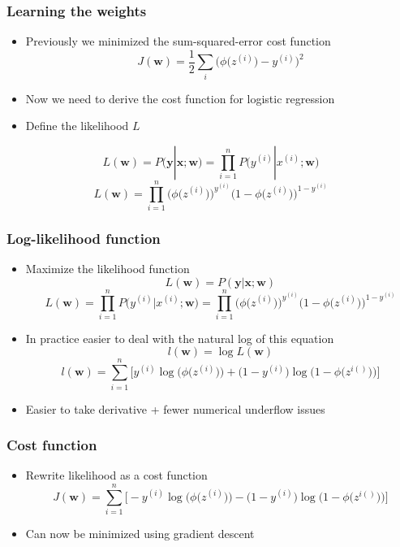 \documentclass{beamer}
\begin{document}
\begin{frame}
  \frametitle{Learning the weights}
  \begin{itemize}
  \item Previously we minimized the sum-squared-error cost function
    \[
    J(\mathbf{w}) = \frac{1}{2} \sum_i \bigg( \phi \big( z^{(i)} \big) - y^{(i)}  \bigg)^2
    \]
  \item Now we need to derive the cost function for logistic regression
  \item Define the likelihood $L$
  \end{itemize}
  \[
  L(\mathbf{w}) = P(\mathbf{y} | \mathbf{x}; \mathbf{w}) = \prod_{i=1}^{n} P \big( y^{(i)} | x^{(i)}; \mathbf{w} \big)
  \]
  \[
  L(\mathbf{w}) = \prod_{i=1}^{n} \bigg( \phi \big(z^{(i)} \big) \bigg) ^ {y^{(i)}} \bigg( 1 - \phi \big( z^{(i)} \big) \bigg)^{1-y^{(i)}}
  \]
\end{frame}

\begin{frame}
  \frametitle{Log-likelihood function}
  \begin{itemize}
  \item Maximize the likelihood function
    \[
    L(\mathbf{w}) = P(\mathbf{y} | \mathbf{x}; \mathbf{w})
    \]
    \[
    L(\mathbf{w}) = \prod_{i=1}^{n} P \big( y^{(i)} | x^{(i)}; \mathbf{w} \big) =  \prod_{i=1}^{n} \bigg( \phi \big(z^{(i)} \big) \bigg) ^ {y^{(i)}} \bigg( 1 - \phi \big( z^{(i)} \big) \bigg)^{1-y^{(i)}}
    \]
  \item In practice easier to deal with the natural log of this equation
    \[
    l(\mathbf{w}) = \log L(\mathbf{w})
    \]
    \[
    l(\mathbf{w}) = \sum_{i=1}^{n} \Bigg[ y^{(i)} \log \bigg(\phi \big( z^{(i)} \big) \bigg) + \bigg(1 - y^{(i)} \bigg) \log \bigg( 1 - \phi \big( z^{i()} \big) \bigg)  \Bigg]
    \]
    \item Easier to take derivative + fewer numerical underflow issues
  \end{itemize}
\end{frame}

\begin{frame}
  \frametitle{Cost function}
  \begin{itemize}
  \item Rewrite likelihood as a cost function
    \[
    J(\mathbf{w}) = \sum_{i=1}^{n} \Bigg[- y^{(i)} \log \bigg(\phi \big( z^{(i)} \big) \bigg) - \bigg(1 - y^{(i)} \bigg) \log \bigg( 1 - \phi \big( z^{i()} \big) \bigg)  \Bigg]
    \]
  \item Can now be minimized using gradient descent
  \end{itemize} \href{https://github.com/rasbt/python-machine-learning-book/blob/master/code/ch03/ch03.ipynb}{}
\end{frame}
\end{document}
